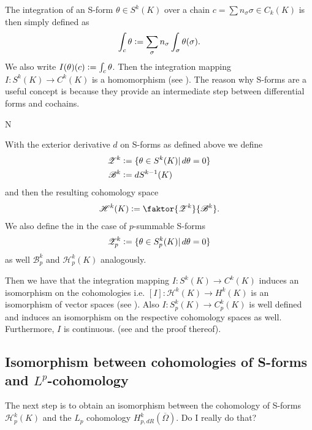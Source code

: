 \documentclass[12pt,a4paper]{article}
\numberwithin{equation}{subsection}
\numberwithin{lemma}{subsection}
\theoremstyle{definition}
\newcommand{\lpcoho}{H^k_{p,dR}}
\newcommand{\omegabar}{\overline{\Omega}}
\begin{document}
The integration of an S-form $\theta \in S^k(K)$ over a chain
$c = \sum n_\sigma \sigma \in C_k(K)$ is then simply defined as 
\begin{align*}
    \int_c \theta 
    \vcentcolon= \sum\limits_\sigma n_\sigma \int_\sigma \theta(\sigma).
\end{align*}
We also write $I(\theta)(c) \vcentcolon= \int_c \theta$.
Then the integration mapping $I: S^k(K) \rightarrow C^k(K)$ is a homomorphism
(see \cite[p.191]{goldshtein}).
The reason why S-forms are a useful concept is because they provide an 
intermediate step between differential forms and cochains.

N

With the exterior derivative $d$ on S-forms as defined above we define 
\begin{align*}
    \mathscr{Z}^k &\vcentcolon= \{ \theta \in S^k(K) | \, d\theta = 0 \} \\
    \mathscr{B}^k &\vcentcolon= dS^{k-1}(K)
\end{align*}
and then the resulting cohomology space
\begin{align*}
    \mathscr{H}^k(K) \vcentcolon= 
    \faktor{\mathscr{Z}^k}{\mathscr{B}^k}.
\end{align*}
We also define the in the case of $p$-summable S-forms
\begin{align*}
    \mathscr{Z}_p^k &\vcentcolon= \{ \theta \in S_p^k(K) | \, d\theta = 0 \} \\
\end{align*}
as well $\mathscr{B}_p^k$ and $\mathscr{H}_p^k(K)$ analogously.

Then we have that the integration mapping
$I: S^k(K) \rightarrow C^k(K)$ 
induces an isomorphism on the cohomologies i.e. 
$[I]: \mathscr{H}^k(K) \rightarrow H^k(K)$ is an isomorphism of vector 
spaces (see \cite[p.191]{goldshtein}).
Also $I: S_p^k(K) \rightarrow C_p^k(K)$ is well defined and induces an
isomorphism on the respective cohomology spaces as well. Furthermore, 
$I$ is continuous.
(see \cite[Thm.\,1]{goldshtein} and the proof thereof).



\subsection{Isomorphism between cohomologies of S-forms and $L^p$-cohomology}


The next step is to obtain an isomorphism between the cohomology 
of S-forms $\mathscr{H}_p^k(K)$ and the $L_p$ cohomology 
$\lpcoho(\omegabar)$. {\color{red} Do I really do that?}
\end{document}
